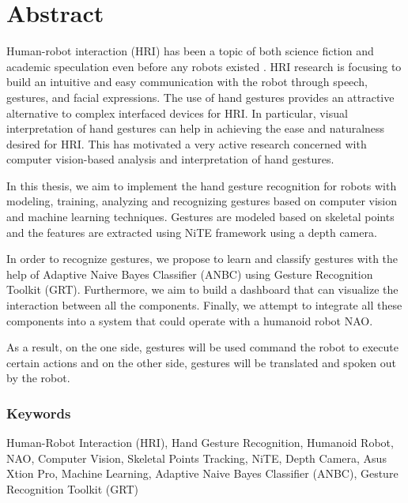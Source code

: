 \chapter*{Abstract}
Human-robot interaction (HRI) has been a topic of both science fiction and academic speculation even before any robots existed \cite{7}. HRI research is focusing to build an intuitive and easy communication with the robot through speech, gestures, and facial expressions. The use of hand gestures provides an attractive alternative to complex interfaced devices for HRI. In particular, visual interpretation of hand gestures can help in achieving the ease and naturalness desired for HRI. This has motivated a very active research concerned with computer vision-based analysis and interpretation of hand gestures.

In this thesis, we aim to implement the hand gesture recognition for robots with modeling, training, analyzing and recognizing gestures based on computer vision and machine learning techniques. Gestures are modeled based on skeletal points and the features are extracted using NiTE framework using a depth camera. 

In order to recognize gestures, we propose to learn and classify gestures with the help of Adaptive Naive Bayes Classifier (ANBC) using Gesture Recognition Toolkit (GRT). Furthermore, we aim to build a dashboard that can visualize the interaction between all the components. Finally, we attempt to integrate all these components into a system that could operate with a humanoid robot NAO.

As a result, on the one side, gestures will be used command the robot to execute certain actions and on the other side, gestures will be translated and spoken out by the robot. 


\subsection*{Keywords} Human-Robot Interaction (HRI), Hand Gesture Recognition, Humanoid Robot, NAO, Computer Vision, Skeletal Points Tracking, NiTE, Depth Camera, Asus Xtion Pro, Machine Learning, Adaptive Naive Bayes Classifier (ANBC), Gesture Recognition Toolkit (GRT)


